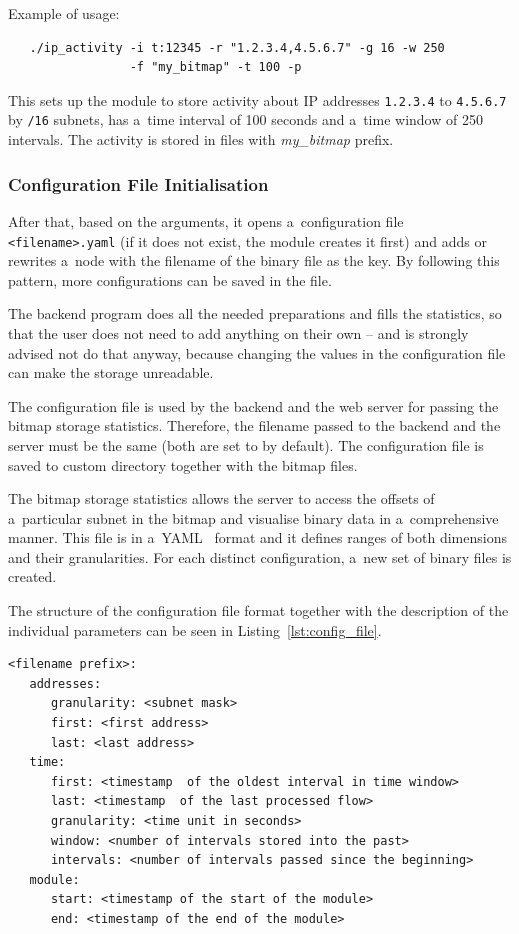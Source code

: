 Example of usage: 
\begin{lstlisting}
   ./ip_activity -i t:12345 -r "1.2.3.4,4.5.6.7" -g 16 -w 250
                 -f "my_bitmap" -t 100 -p
\end{lstlisting}
This sets up the module to store activity about IP addresses \texttt{1.2.3.4} to \texttt{4.5.6.7} by \texttt{/16} subnets,
has a~time interval of 100 seconds and a~time window of 250 intervals. The activity is stored
in files with \textit{my\_bitmap} prefix.

\subsubsection{Configuration File Initialisation}\label{sec:config_file}
After that, based on the arguments, it opens a~configuration file \texttt{<filename>.yaml}
(if it does not exist, the module creates it first) and adds or rewrites a~node
with the filename of the binary file as the key. By following this pattern, more configurations can be saved in the file.

The backend program does all the needed preparations and fills the statistics, so that the user does not need to add anything on their own
-- and is strongly advised not do that anyway, because changing the values in the configuration file can make the storage unreadable.

The configuration file is used by the backend and the web server for passing the bitmap storage statistics. Therefore,
the filename passed to the backend and the server must be the same (both are set to  by default).
The configuration file is saved to custom directory together with the bitmap files.

The bitmap storage statistics allows the server to access the offsets of
a~particular subnet in the bitmap and visualise binary data in
a~comprehensive manner. This file is in a~YAML~\cite{yaml} format and it
defines ranges of both dimensions and their granularities.
For each distinct configuration, a~new set of binary files is created.

The structure of the configuration file format together with the description of the individual parameters
can be seen in Listing~\ref{lst:config_file}.

\begin{lstlisting}[label={lst:config_file},captionpos=b,caption={Configuration File Structure}]
<filename prefix>:
   addresses:
      granularity: <subnet mask>
      first: <first address>
      last: <last address>
   time:
      first: <timestamp  of the oldest interval in time window>
      last: <timestamp  of the last processed flow>
      granularity: <time unit in seconds>
      window: <number of intervals stored into the past>
      intervals: <number of intervals passed since the beginning>
   module:
      start: <timestamp of the start of the module>
      end: <timestamp of the end of the module>
\end{lstlisting}

